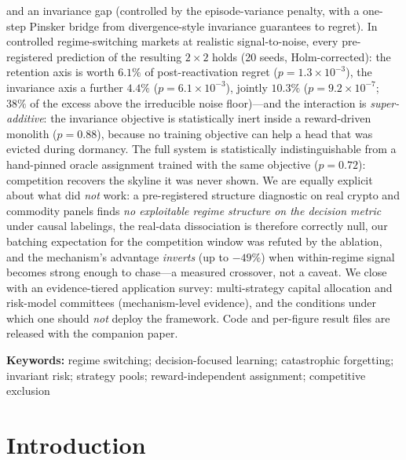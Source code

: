 \documentclass[10pt]{article}
\begin{document}
\begin{abstractbox}
and an invariance gap (controlled by the episode-variance penalty, with a
one-step Pinsker bridge from divergence-style invariance guarantees to
regret). In controlled regime-switching markets at realistic signal-to-noise,
every pre-registered prediction of the resulting $2{\times}2$ holds (20
seeds, Holm-corrected): the retention axis is worth $6.1\%$ of
post-reactivation regret ($p{=}1.3{\times}10^{-3}$), the invariance axis a
further $4.4\%$ ($p{=}6.1{\times}10^{-3}$), jointly $10.3\%$
($p{=}9.2{\times}10^{-7}$; $38\%$ of the excess above the irreducible noise
floor)---and the interaction is \emph{super-additive}: the invariance
objective is statistically inert inside a reward-driven monolith
($p{=}0.88$), because no training objective can help a head that was evicted
during dormancy. The full system is statistically indistinguishable from a
hand-pinned oracle assignment trained with the same objective ($p{=}0.72$):
competition recovers the skyline it was never shown. We are equally explicit
about what did \emph{not} work: a pre-registered structure diagnostic on real
crypto and commodity panels finds \emph{no exploitable regime structure on
the decision metric} under causal labelings, the real-data dissociation is
therefore correctly null, our batching expectation for the competition
window was refuted by the ablation, and the mechanism's advantage
\emph{inverts} (up to $-49\%$) when within-regime signal becomes strong
enough to chase---a measured crossover, not a caveat. We close with an
evidence-tiered application survey: multi-strategy capital allocation and
risk-model committees (mechanism-level evidence), and the conditions under
which one should \emph{not} deploy the framework. Code and per-figure result
files are released with the companion paper.
\end{abstractbox}

\vspace{0.25cm}
\noindent\textbf{Keywords:} regime switching; decision-focused learning;
catastrophic forgetting; invariant risk; strategy pools; reward-independent
assignment; competitive exclusion

\newpage
\tableofcontents
\newpage

\section{Introduction}
\end{document}
